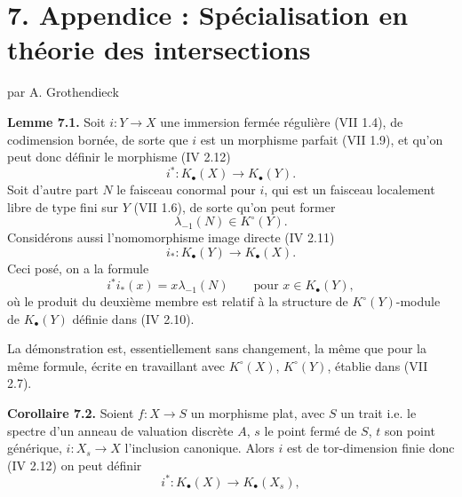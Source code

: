 \section*{7. Appendice : Spécialisation en théorie des intersections}
\begin{center}
par A. Grothendieck
\end{center}

\textbf{Lemme 7.1.} Soit \(i:Y\to X\) une immersion fermée régulière (VII 1.4), de codimension bornée, de sorte que \(i\) est un morphisme parfait (VII 1.9), et qu'on peut donc définir le morphisme (IV 2.12)
\[
 i^*:K_\bullet(X)\longrightarrow K_\bullet(Y).
\]
Soit d'autre part \(N\) le faisceau conormal pour \(i\), qui est un faisceau localement libre de type fini sur \(Y\) (VII 1.6), de sorte qu'on peut former
\[
 \lambda_{-1}(N)\in K^\circ(Y).
\]
Considérons aussi l'nomomorphisme image directe (IV 2.11)
\[
 i_*:K_\bullet(Y)\longrightarrow K_\bullet(X).
\]
Ceci posé, on a la formule
\[
 i^*i_*(x)=x\lambda_{-1}(N)\qquad\text{pour } x\in K_\bullet(Y),
\]
où le produit du deuxième membre est relatif à la structure de \(K^\circ(Y)\)-module de \(K_\bullet(Y)\) définie dans (IV 2.10).

La démonstration est, essentiellement sans changement, la même que pour la même formule, écrite en travaillant avec \(K^\circ(X)\), \(K^\circ(Y)\), établie dans (VII 2.7).

\textbf{Corollaire 7.2.} Soient \(f:X\to S\) un morphisme plat, avec \(S\) un trait i.e. le spectre d'un anneau de valuation discrète \(A\), \(s\) le point fermé de \(S\), \(t\) son point générique, \(i:X_s\to X\) l'inclusion canonique. Alors \(i\) est de tor-dimension finie donc (IV 2.12) on peut définir
\[
 i^*:K_\bullet(X)\longrightarrow K_\bullet(X_s),
\]
